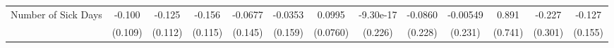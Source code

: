 {\begin{tabular}{l*{12}{c}}
\addlinespace
Number of Sick Days&      -0.100         &      -0.125         &      -0.156         &     -0.0677         &     -0.0353         &      0.0995         &   -9.30e-17         &     -0.0860         &    -0.00549         &       0.891         &      -0.227         &      -0.127         \\
            &     (0.109)         &     (0.112)         &     (0.115)         &     (0.145)         &     (0.159)         &    (0.0760)         &     (0.226)         &     (0.228)         &     (0.231)         &     (0.741)         &     (0.301)         &     (0.155)         \\
\bottomrule
\end{tabular}
}
